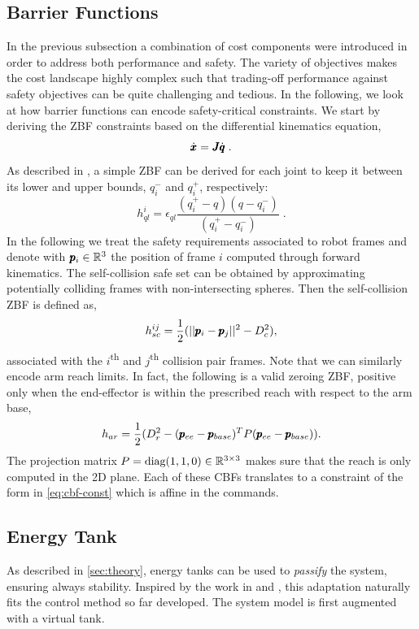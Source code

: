 \subsection{Barrier Functions}
In the previous subsection a combination of cost components were introduced in order to address both performance and safety. The variety of objectives makes the cost landscape highly complex such that trading-off performance against safety objectives can be quite challenging and tedious. In the following, we look at how barrier functions can encode safety-critical constraints. We start by deriving the ZBF constraints based on the differential kinematics equation,
\begin{equation}
    \dot{\pmb{x}} = \pmb{J} \dot{\pmb{q}}\;.
\end{equation}
As described in \cite{benzi2021optimization}, a simple ZBF can be derived for each joint to keep it between its lower and upper bounds, $q_i^-$ and $q_i^+$, respectively:
\begin{equation}
h_{ql}^i = \epsilon_{ql} \frac{(q_i^+ - q)(q - q_i^-)}{(q_i^+ - q_i^-)}\;.
\end{equation}
In the following we treat the safety requirements associated to robot frames and denote with $\pmb{p}_{i} \in \mathbb{R}^{3}$ the position of frame $i$ computed through forward kinematics.  
The self-collision safe set can be obtained by approximating potentially colliding frames with non-intersecting spheres. Then the self-collision ZBF is defined as,
\begin{equation}
    h_{sc}^{ij} = \frac{1}{2}(||\pmb{p}_i - \pmb{p}_j||^2 - D_c^2),
\end{equation}
associated with the $i$\textsuperscript{th}  and $j$\textsuperscript{th} collision pair frames. Note that we can similarly encode arm reach limits. In fact, the following is a valid zeroing ZBF, positive only when the end-effector is within the prescribed reach with respect to the arm base,
\begin{equation}
    h_{ar} = \frac{1}{2}(D_r^2 - (\pmb{p}_{ee} - \pmb{p}_{base})^T P (\pmb{p}_{ee} - \pmb{p}_{base}) ).
\end{equation}
The projection matrix $P = \text{diag}(1, 1, 0) \in \mathbb{R}^{3 \times 3}$ makes sure that the reach is only computed in the 2D plane. Each of these CBFs translates to a constraint of the form in \eqref{eq:cbf-const} which is affine in the commands. 

\subsection{Energy Tank}
As described in \sect \ref{sec:theory}, energy tanks can be used to \emph{passify} the system, ensuring always stability. Inspired by the work in \cite{benzi2021optimization} and \cite{shahriari2018valve}, this adaptation naturally fits the control method so far developed. The system model is first augmented with a virtual tank. 

